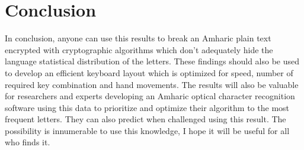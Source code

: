 \section{Conclusion}

In conclusion, anyone can use this results to break an Amharic plain text encrypted with cryptographic algorithms which don't adequately hide the language statistical distribution of the letters. These findings should also be used to develop an efficient keyboard layout which is optimized for speed, number of required key combination and hand movements. The results will also be valuable for researchers and experts developing an Amharic optical character recognition software using this data to prioritize and optimize their algorithm to the most frequent letters. They can also predict when challenged using this result. The possibility is innumerable to use this knowledge, I hope it will be useful for all who finds it.